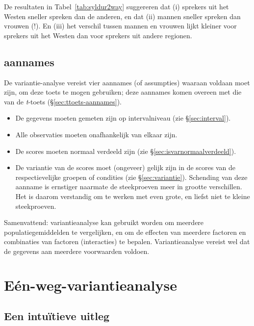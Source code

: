 \documentclass[
]{book}
\begin{document}
De resultaten in Tabel~\ref{tab:syldur2way} suggereren dat (i) sprekers uit het Westen
sneller spreken dan de anderen, en dat (ii) mannen sneller spreken dan
vrouwen (!). En (iii) het verschil tussen mannen en vrouwen lijkt
kleiner voor sprekers uit het Westen dan voor sprekers uit andere
regionen.

\hypertarget{aannames-2}{%
\subsection{aannames}\label{aannames-2}}

De variantie-analyse vereist vier aannames (of assumpties) waaraan
voldaan moet zijn, om deze toets te mogen gebruiken; deze aannames komen
overeen met die van de \emph{t}-toets
(§\ref{sec:ttoets-aannames}).

\begin{itemize}
\item
  De gegevens moeten gemeten zijn op intervalniveau (zie
  §\ref{sec:interval}).
\item
  Alle observaties moeten onafhankelijk van elkaar zijn.
\item
  De scores moeten normaal verdeeld zijn (zie
  §\ref{sec:isvarnormaalverdeeld}).
\item
  De variantie van de scores moet (ongeveer) gelijk zijn in de
  scores van de respectievelijke groepen of condities (zie
  §\ref{sec:variantie}).
  Schending van deze aanname is ernstiger
  naarmate de steekproeven meer in grootte verschillen. Het is daarom
  verstandig om te werken met even grote, en liefst niet te kleine
  steekproeven.
\end{itemize}

Samenvattend: variantieanalyse kan gebruikt worden om meerdere
populatiegemiddelden te vergelijken, en om de effecten van meerdere
factoren en combinaties van factoren (interacties) te bepalen.
Variantieanalyse vereist wel dat de gegevens aan meerdere voorwaarden
voldoen.

\hypertarget{euxe9n-weg-variantieanalyse}{%
\section{Eén-weg-variantieanalyse}\label{euxe9n-weg-variantieanalyse}}

\hypertarget{sec:anova-oneway-uitleg}{%
\subsection{Een intuïtieve uitleg}\label{sec:anova-oneway-uitleg}}
\end{document}
